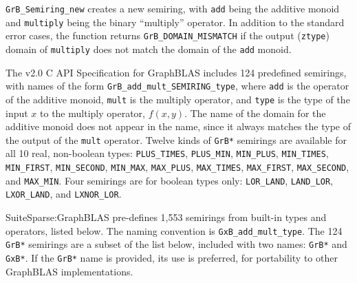 \documentclass[12pt]{article}
\begin{document}
\verb'GrB_Semiring_new' creates a new semiring, with \verb'add' being the
additive monoid and \verb'multiply' being the binary ``multiply'' operator.  In
addition to the standard error cases, the function returns
\verb'GrB_DOMAIN_MISMATCH' if the output (\verb'ztype') domain of
\verb'multiply' does not match the domain of the \verb'add' monoid.

The v2.0 C API Specification for GraphBLAS includes 124 predefined semirings,
with names of the form \verb'GrB_add_mult_SEMIRING_type', where \verb'add' is
the operator of the additive monoid, \verb'mult' is the multiply operator, and
\verb'type' is the type of the input $x$ to the multiply operator, $f(x,y)$.
The name of the domain for the additive monoid does not appear in the name,
since it always matches the type of the output of the \verb'mult' operator.
Twelve kinds of \verb'GrB*' semirings are available for all 10 real, non-boolean types:
    \verb'PLUS_TIMES', \verb'PLUS_MIN',
    \verb'MIN_PLUS', \verb'MIN_TIMES', \verb'MIN_FIRST', \verb'MIN_SECOND', \verb'MIN_MAX',
    \verb'MAX_PLUS', \verb'MAX_TIMES', \verb'MAX_FIRST', \verb'MAX_SECOND', and \verb'MAX_MIN'.
Four semirings are for boolean types only: 
    \verb'LOR_LAND', \verb'LAND_LOR', \verb'LXOR_LAND', and \verb'LXNOR_LOR'.

SuiteSparse:GraphBLAS pre-defines 1,553 semirings from built-in types and
operators, listed below.  The naming convention is \verb'GxB_add_mult_type'.
The 124 \verb'GrB*' semirings are a subset of the list below, included with two
names: \verb'GrB*' and \verb'GxB*'.  If the \verb'GrB*' name is provided, its
use is preferred, for portability to other GraphBLAS implementations.
\end{document}
